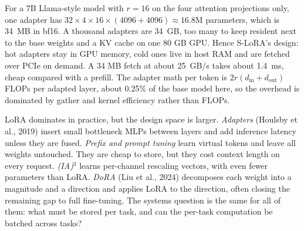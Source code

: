 \begin{napkinmath}
For a 7B Llama-style model with $r=16$ on the four attention projections only, one
adapter has $32\times4\times16\times(4096+4096)\approx16.8$M parameters, which is
\SI{34}{MB} in bf16. A thousand adapters are \SI{34}{GB}, too many to keep resident
next to the base weights and a KV cache on one 80 GB GPU. Hence S-LoRA's design: hot
adapters stay in GPU memory, cold ones live in host RAM and are fetched over PCIe on
demand. A 34 MB fetch at about \SI{25}{GB/s} takes about \SI{1.4}{ms}, cheap compared
with a prefill. The adapter math per token is
$2r(d_\text{in}+d_\text{out})$ FLOPs per adapted layer, about 0.25\% of the base model
here, so the overhead is dominated by gather and kernel efficiency rather than FLOPs.
\end{napkinmath}

\begin{deepdive}
LoRA dominates in practice, but the design space is larger.
\emph{Adapters} (Houlsby et al., 2019) insert small bottleneck MLPs between layers and
add inference latency unless they are fused. \emph{Prefix and prompt tuning} learn
virtual tokens and leave all weights untouched. They are cheap to store, but they cost
context length on every request. \emph{(IA)$^3$} learns per-channel rescaling vectors,
with even fewer parameters than LoRA. \emph{DoRA} (Liu et al., 2024) decomposes each
weight into a magnitude and a direction and applies LoRA to the direction, often
closing the remaining gap to full fine-tuning. The systems question is the same for all
of them: what must be stored per task, and can the per-task computation be batched
across tasks?
\end{deepdive}

